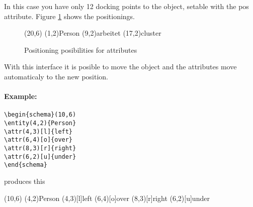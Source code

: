 \documentclass[a4paper,11pt]{article}
\begin{document}
In this case you have only 12 docking points to the object, setable with the pos attribute.
Figure \ref{fig:attr_pos} shows the positionings.

\begin{figure}[htb]
  \centering
  \begin{schema}(20,6)
  \entity(1,2){Person}
  \relation(9,2){arbeitet}
  \cluster(17,2){cluster}
\end{schema}

  \caption{Positioning posibilities for attributes}
  \label{fig:attr_pos}
\end{figure}

With this interface it is posible to move the object and the attributes
move automaticaly to the new position.

\paragraph{Example:}

\begin{verbatim}
\begin{schema}(10,6)
\entity(4,2){Person}
\attr(4,3)[l]{left}
\attr(6,4)[o]{over}
\attr(8,3)[r]{right}
\attr(6,2)[u]{under}
\end{schema}
\end{verbatim}

produces this

\begin{schema}(10,6)
\entity(4,2){Person}
\attr(4,3)[l]{left}
\attr(6,4)[o]{over}
\attr(8,3)[r]{right}
\attr(6,2)[u]{under}
\end{schema}
\end{document}
